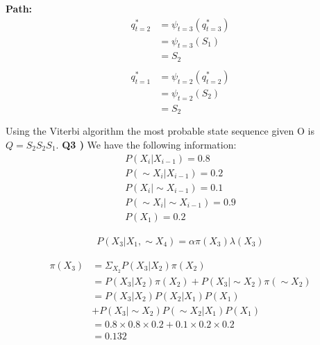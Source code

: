 \documentclass[12pt]{article}
\begin{document}
\textbf{Path:}
\begin{equation}
	\begin{aligned}
		q_{t=2}^*&=\psi_{t=3}(q_{t=3}^*) \\
		&=\psi_{t=3}(S_1) \\
		&=S_2 \\ \\
		q_{t=1}^*&=\psi_{t=2}(q_{t=2}^*) \\
		&=\psi_{t=2}(S_2) \\
		&=S_2 \\ \\
	\end{aligned}
\end{equation}
Using the Viterbi algorithm the most probable state sequence given O is $Q=S_{2}S_{2}S_{1}$.\newpage
\textbf{Q3 )} 
We have the following information:
\begin{equation}
	\begin{aligned}
		P(X_i | X_{i-1}) = 0.8 \\
		P(\sim X_i | X_{i-1}) = 0.2 \\
		P(X_i | \sim X_{i-1}) = 0.1 \\
		P(\sim X_i | \sim X_{i-1}) = 0.9 \\
		P(X_1) = 0.2
	\end{aligned}
\end{equation}

\begin{equation}
	\begin{aligned}
		P(X_3 | X_1, \sim X_4) = \alpha \pi (X_3) \lambda (X_3)
	\end{aligned}
\end{equation}

\begin{equation}
	\begin{aligned}
		\pi (X_3) &= \Sigma_{X_2} P(X_3 | X_2) \pi(X_2)\\
		&=P(X_3 | X_2)\pi(X_2) + P(X_3 | \sim X_2)\pi(\sim X_2)\\
		&=P(X_3 | X_2)P(X_2 | X_1)P(X_1) \\
		&+ P(X_3 | \sim X_2)P(\sim X_2 | X_1)P(X_1) \\
		&= 0.8 \times 0.8 \times 0.2 + 0.1 \times 0.2 \times 0.2 \\
		&= 0.132
	\end{aligned}
\end{equation}
\end{document}
